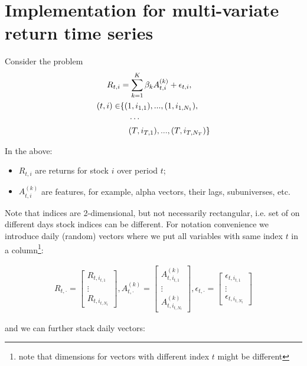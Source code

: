 \section{Implementation for multi-variate return time series}
Consider the problem 
\begin{align}\label{eq:return_alpha}
	R_{t,i} &= \sum_{k=1}^K \beta_k A^{(k)}_{t,i} + \epsilon_{t,i}, \\
	(t,i) \in &\{(1, i_{1,1}),...,(1, i_{1, N_1}),\notag\\
	&\phantom{\in\ }\cdots\notag\\
	&\phantom{\in\ }(T, i_{T,1}),...,(T, i_{T, N_T})\} \notag
\end{align}

In the above:
\begin{itemize}
	\item $R_{t,i}$ are returns for stock $i$ over period $t$;
	\item $A^{(k)}_{t,i}$ are features, for example, alpha vectors, their lags, subuniverses, etc.
\end{itemize} 

Note that indices are 2-dimensional, but not necessarily rectangular, i.e. set of on different days stock indices can be different. For notation convenience we introduce daily (random) vectors where we put all variables with same index $t$ in a column\footnote{note that dimensions for vectors with different index $t$ might be different}:

\begin{align}
	R_{t,\cdot} = \begin{bmatrix}R_{t,i_{t,1}} \\ \vdots \\  R_{t,i_{t, N_t}} \end{bmatrix},
	A^{(k)}_{t,\cdot} = \begin{bmatrix}A^{(k)}_{t,i_{t,1}} \\ \vdots \\  A^{(k)}_{t,i_{t, N_t}} \end{bmatrix},
	\epsilon_{t,\cdot} = \begin{bmatrix}\epsilon_{t,i_{t,1}} \\ \vdots \\  \epsilon_{t,i_{t, N_t}} \end{bmatrix}
\end{align}

and we can further stack daily vectors:

